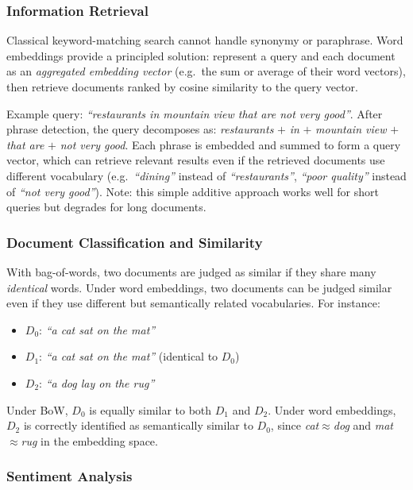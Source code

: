 \documentclass[11pt,a4paper]{article}
\begin{document}
\subsubsection{Information Retrieval}

Classical keyword-matching search cannot handle synonymy or paraphrase. Word embeddings provide a principled solution: represent a query and each document as an \emph{aggregated embedding vector} (e.g.\ the sum or average of their word vectors), then retrieve documents ranked by cosine similarity to the query vector.

Example query: \textit{``restaurants in mountain view that are not very good''}. After phrase detection, the query decomposes as: \textit{restaurants} $+$ \textit{in} $+$ \textit{mountain view} $+$ \textit{that are} $+$ \textit{not very good}. Each phrase is embedded and summed to form a query vector, which can retrieve relevant results even if the retrieved documents use different vocabulary (e.g.\ \textit{``dining''} instead of \textit{``restaurants''}, \textit{``poor quality''} instead of \textit{``not very good''}). Note: this simple additive approach works well for short queries but degrades for long documents.

\subsubsection{Document Classification and Similarity}

With bag-of-words, two documents are judged as similar if they share many \emph{identical} words. Under word embeddings, two documents can be judged similar even if they use different but semantically related vocabularies. For instance:
\begin{itemize}
  \item $D_0$: \textit{``a cat sat on the mat''}
  \item $D_1$: \textit{``a cat sat on the mat''} (identical to $D_0$)
  \item $D_2$: \textit{``a dog lay on the rug''}
\end{itemize}
Under BoW, $D_0$ is equally similar to both $D_1$ and $D_2$. Under word embeddings, $D_2$ is correctly identified as semantically similar to $D_0$, since \textit{cat}$\approx$\textit{dog} and \textit{mat}$\approx$\textit{rug} in the embedding space.

\subsubsection{Sentiment Analysis}
\end{document}

